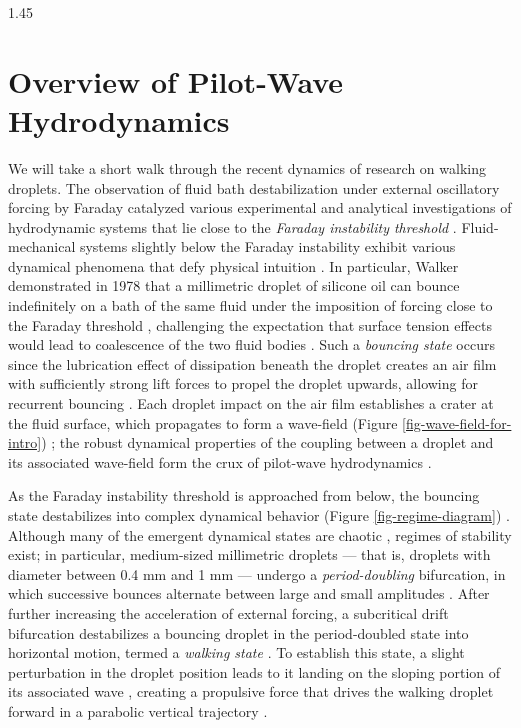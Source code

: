 \documentclass[12pt,titlepage]{article}
\theoremstyle{definition}
\theoremstyle{remark}
\begin{document}
\begin{spacing}{1.45}
\section{Overview of Pilot-Wave Hydrodynamics}

We will take a short walk through the recent dynamics of research on walking droplets. The observation of fluid bath destabilization under external oscillatory forcing by Faraday \cite{faraday1831xvii} catalyzed various experimental and analytical investigations of hydrodynamic systems that lie close to the \textit{Faraday instability threshold} \cite{oza2013trajectory, benjamin1954stability, douady1990experimental}. Fluid-mechanical systems slightly below the Faraday instability exhibit various dynamical phenomena that defy physical intuition \cite{douady1990experimental, kaydureybush, couder2005bouncing,  faria2017model}. In particular, Walker demonstrated in 1978 that a millimetric droplet of silicone oil can bounce indefinitely on a bath of the same fluid under the imposition of forcing close to the Faraday threshold \cite{walker1978drops}, challenging the expectation that surface tension effects would lead to coalescence of the two fluid bodies \cite{couder2005bouncing}. Such a \textit{bouncing state} occurs since the lubrication effect of dissipation beneath the droplet creates an air film with sufficiently strong lift forces to propel the droplet upwards, allowing for recurrent bouncing \cite{couder2005bouncing,  walker1978drops,fort2010path}. Each droplet impact on the air film establishes a crater at the fluid surface, which propagates to form a wave-field (Figure \ref{fig-wave-field-for-intro}) \cite{couder2005bouncing}; the robust dynamical properties of the coupling between a droplet and its associated wave-field form the crux of pilot-wave hydrodynamics \cite{bush2015pilot}.

As the Faraday instability threshold is approached from below, the bouncing state destabilizes into complex dynamical behavior (Figure \ref{fig-regime-diagram}) \cite{kaydureybush, couder2006single, gilet2009chaotic}. Although many of the emergent dynamical states are chaotic \cite{gilet2009chaotic, pucci2018walking}, regimes of stability exist; in particular, medium-sized millimetric droplets --- that is, droplets with diameter between 0.4 mm and 1 mm --- undergo a \textit{period-doubling} bifurcation, in which successive bounces alternate between large and small amplitudes \cite{couder2006single}. After further increasing the acceleration of external forcing, a subcritical drift bifurcation destabilizes a bouncing droplet in the period-doubled state into horizontal motion, termed a \textit{walking state} \cite{couder2006single, rahman2020walking}. To establish this state, a slight perturbation in the droplet position leads to it landing on the sloping portion of its associated wave \cite{oza2013trajectory}, creating a propulsive force that drives the walking droplet forward in a parabolic vertical trajectory \cite{molavcek2013drops}.


\end{spacing}
\end{document}
